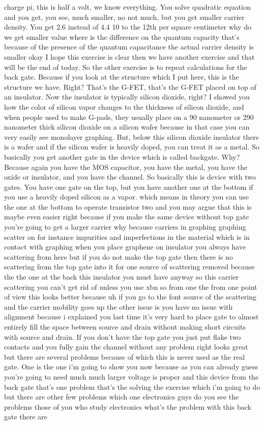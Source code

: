 charge pi, this is half a volt, we know everything. You solve quadratic equation and you get, you see, much smaller, no not much, but you get smaller carrier density. You get 2.6 instead of 4.4 10 to the 12th per square centimeter why do we get smaller value where is the difference on the quantum capacity that's because of the presence of the quantum capacitance the actual carrier density is smaller okay I hope this exercise is clear then we have another exercise and that will be the end of today.
So the other exercise is to repeat calculations for the back gate. Because if you look at the structure which I put here, this is the structure we have. Right? That's the G-FET, that's the G-FET placed on top of an insulator. Now the insulator is typically silicon dioxide, right? I showed you how the color of silicon vapor changes to the thickness of silicon dioxide, and when people used to make G-pads, they usually place on a 90 nanometer or 290 nanometer thick silicon dioxide on a silicon wafer because in that case you can very easily see monolayer graphing. But, below this silicon dioxide insulator there is a wafer and if the silicon wafer is heavily doped, you can treat it as a metal. So basically you get another gate in the device which is called backgate. Why? Because again you have the MOS capacitor, you have the metal, you have the oxide or insulator, and you have the channel. So basically this is device with two gates. You have one gate on the top, but you have another one at the bottom if you use a heavily doped silicon as a vapor. which means in theory you can use the one at the bottom to operate transistor two and you may argue that this is maybe even easier right because if you make the same device without top gate you're going to get a larger carrier why because carriers in graphing graphing scatter on for instance impurities and imperfections in the material which is in contact with graphing when you place graphene on insulator you always have scattering from here but if you do not make the top gate then there is no scattering from the top gate into it for one source of scattering removed because the the one at the back this insulator you must have anyway so this carrier scattering you can't get rid of unless you use xbn so from one the from one point of view this looks better because uh if you go to the font source of the scattering and the carrier mobility goes up the other issue is you have no issue with alignment because i explained you last time it's very hard to place gate to almost entirely fill the space between source and drain without making short circuits with source and drain. If you don't have the top gate you just put flake two contacts and you fully gain the channel without any problem right looks great but there are several problems because of which this is never used as the real gate. One is the one i'm going to show you now because as you can already guess you're going to need much much larger voltage is proper and this device from the back gate that's one problem that's the solving the exercise which i'm going to do but there are other few problems which one electronics guys do you see the problems those of you who study electronics what's the problem with this back gate there are 